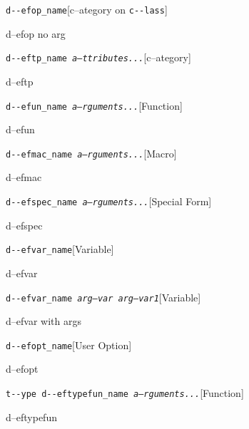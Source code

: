 \documentclass{book}
\begin{document}
\begin{titlepage}
\noindent\texttt{d{-}{-}efop\_name}\hfill[c--ategory on \texttt{c{-}{-}lass}]



%
d--efop no arg

\noindent\texttt{d{-}{-}eftp\_name \bgroup{}\normalfont{}\textsl{a--ttributes...}\egroup{}}\hfill[c--ategory]



%
d--eftp

\noindent\texttt{d{-}{-}efun\_name \bgroup{}\normalfont{}\textsl{a--rguments...}\egroup{}}\hfill[Function]



%
d--efun

\noindent\texttt{d{-}{-}efmac\_name \bgroup{}\normalfont{}\textsl{a--rguments...}\egroup{}}\hfill[Macro]



%
d--efmac

\noindent\texttt{d{-}{-}efspec\_name \bgroup{}\normalfont{}\textsl{a--rguments...}\egroup{}}\hfill[Special Form]



%
d--efspec

\noindent\texttt{d{-}{-}efvar\_name}\hfill[Variable]



%
d--efvar

\noindent\texttt{d{-}{-}efvar\_name \bgroup{}\normalfont{}\textsl{arg--var arg--var1}\egroup{}}\hfill[Variable]



%
d--efvar with args

\noindent\texttt{d{-}{-}efopt\_name}\hfill[User Option]



%
d--efopt

\noindent\texttt{t{-}{-}ype d{-}{-}eftypefun\_name \bgroup{}\normalfont{}\textsl{a--rguments...}\egroup{}}\hfill[Function]



%
d--eftypefun


\end{titlepage}
\end{document}
